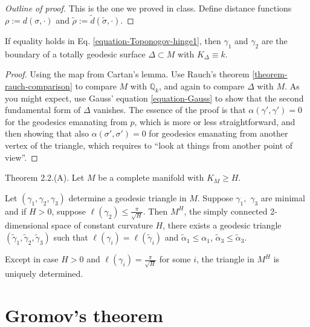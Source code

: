 \begin{proof}[Outline of proof]
This is the one we proved in class. Define
distance functions
$\rho:=d(\sigma,\cdot)$ and
$\tilde{\rho}:=\tilde{d}(\tilde{\sigma},
\cdot)$.
\end{proof}

\begin{lemma}
\label{lemma-equality-Toponogov}
If equality holds in Eq.
\ref{equation-Toponogov-hinge1}, then
$\gamma_1$ and
$\gamma_2$ are the boundary of a totally
geodesic surface $\Delta \subset M$
with $K_\Delta \equiv k$.
\end{lemma}

\begin{proof}
Using the map from Cartan's lemma. Use
Rauch's theorem \ref{theorem-rauch-comparison} to
compare $M$ with $\mathbb{Q}_k$, and again to
compare $\Delta$ with $M$. As you
might expect, use Gauss' equation
\ref{equation-Gauss} to show that the second
fundamental form of $\Delta$ vanishes. The
essence of the proof is that
$\alpha(\gamma',\gamma')=0$ for the geodesics
emanating from $p$, which is more
or less straightforward, and then showing
that also $\alpha(\sigma',\sigma')=0$
for geodesics emanating from another vertex
of the triangle, which requires to
``look at things from another point of
view''.
\end{proof}

\begin{theorem}
\label{theorem-Toponogov-angle}
\cite{Cheeger-Ebin} Theorem 2.2.(A). Let $M$
be a complete manifold with
$K_M\geq H$.

Let $(\gamma_1,\gamma_2,\gamma_3)$ determine
a geodesic triangle in $M$. Suppose
$\gamma_1,$ $\gamma_3$ are minimal and if
$H>0$, suppose $\ell(\gamma_2)\leq
\frac{\pi}{\sqrt{H}}$. Then $M^H$, the simply
connected 2-dimensional space of
constant curvature $H$, there exists a
geodesic triangle
$(\tilde{\gamma}_1,\tilde{\gamma}_2,
\tilde{\gamma}_3)$
such that
$\ell(\gamma_i)=\ell(\tilde{\gamma}_i)$ and
$\tilde{\alpha}_1 \leq\alpha_1$,
$\tilde{\alpha}_3 \leq \tilde{\alpha}_3$.

Except in case $H>0$ and
$\ell(\gamma_i)=\frac{\pi}{\sqrt{H}}$ for
some $i$, the
triangle in $M^H$ is uniquely determined.
\end{theorem}

\section{Gromov's theorem}
\label{section-Gromov-theorem}

